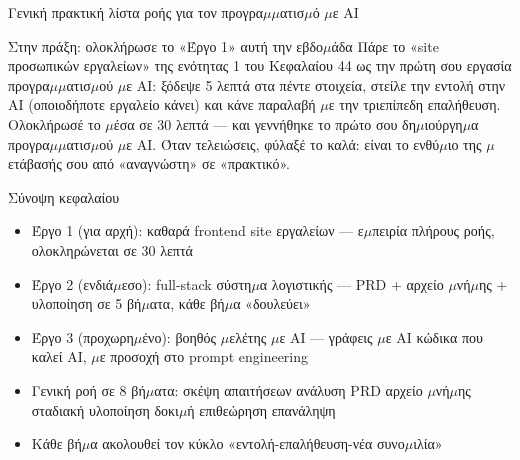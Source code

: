 \begin{center}\small\color{gray}Γενική πρακτική λίστα ροής για τον προγρα$\mu$$\mu$ατισ$\mu$ό $\mu$ε AI\end{center}

\begin{tcbpractice}{Στην πράξη: ολοκλήρωσε το «Έργο 1» αυτή την εβδο$\mu$άδα}
Πάρε το «site προσωπικών εργαλείων» της ενότητας 1 του Κεφαλαίου 44 ως την πρώτη σου εργασία προγρα$\mu$$\mu$ατισ$\mu$ού $\mu$ε AI: ξόδεψε 5 λεπτά στα πέντε στοιχεία, στείλε την εντολή στην AI (οποιοδήποτε εργαλείο κάνει) και κάνε παραλαβή $\mu$ε την τριεπίπεδη επαλήθευση. Ολοκλήρωσέ το $\mu$έσα σε 30 λεπτά — και γεννήθηκε το πρώτο σου δη$\mu$ιούργη$\mu$α προγρα$\mu$$\mu$ατισ$\mu$ού $\mu$ε AI. Όταν τελειώσεις, φύλαξέ το καλά: είναι το ενθύ$\mu$ιο της $\mu$ετάβασής σου από «αναγνώστη» σε «πρακτικό».

\end{tcbpractice}

\begin{tcbsummary}{Σύνοψη κεφαλαίου}
\begin{itemize}
  \item Έργο 1 (για αρχή): καθαρά frontend site εργαλείων — ε$\mu$πειρία πλήρους ροής, ολοκληρώνεται σε 30 λεπτά
  \item Έργο 2 (ενδιά$\mu$εσο): full-stack σύστη$\mu$α λογιστικής — PRD + αρχείο $\mu$νή$\mu$ης + υλοποίηση σε 5 βή$\mu$ατα, κάθε βή$\mu$α «δουλεύει»
  \item Έργο 3 (προχωρη$\mu$ένο): βοηθός $\mu$ελέτης $\mu$ε AI — γράφεις $\mu$ε AI κώδικα που καλεί AI, $\mu$ε προσοχή στο prompt engineering
  \item Γενική ροή σε 8 βή$\mu$ατα: σκέψη απαιτήσεων ανάλυση PRD αρχείο $\mu$νή$\mu$ης σταδιακή υλοποίηση δοκι$\mu$ή επιθεώρηση επανάληψη
  \item Κάθε βή$\mu$α ακολουθεί τον κύκλο «εντολή-επαλήθευση-νέα συνο$\mu$ιλία»
\end{itemize}

\end{tcbsummary}
